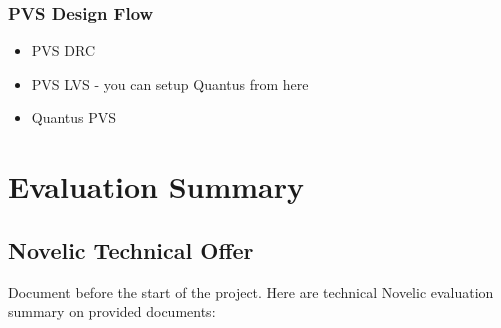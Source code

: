 \documentclass{article}
\begin{document}
\subsubsection*{PVS Design Flow}

\begin{itemize}
	\item PVS DRC 
	\item PVS LVS - you can setup Quantus from here
	\item Quantus PVS 
\end{itemize}



\section{Evaluation Summary}


\subsection{Novelic Technical Offer}

Document before the start of the project. Here are technical Novelic evaluation summary on provided documents:  %
\end{document}
